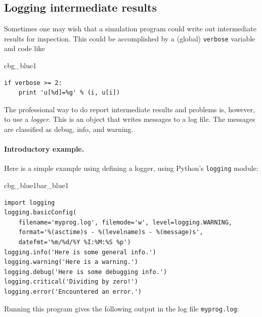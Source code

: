 \documentclass[%
oneside,                 %
final,                   %
10pt]{article}
\newenvironment{_cod_tight}[1]{
   \def\FrameCommand{\colorbox{#1}}
   \FrameRule0.6pt\MakeFramed {\FrameRestore}\vskip3mm}
   {\vskip0mm\endMakeFramed}
\newenvironment{cod}[1]{
\bgroup\rmfamily
\fboxsep=0mm\relax
\begin{_cod_tight}{#1}
\list{}{\parsep=-2mm\parskip=0mm\topsep=0pt\leftmargin=2mm
\rightmargin=2\leftmargin\leftmargin=4pt\relax}
\item\relax}
{\endlist\end{_cod_tight}\egroup}
\newenvironment{_pro_tight}[2]{
   \def\FrameCommand{\color{#2}\vrule width 1mm\normalcolor\colorbox{#1}}
   \FrameRule0.6pt\MakeFramed {\advance\hsize-2mm\FrameRestore}\vskip3mm}
   {\vskip0mm\endMakeFramed}
\newenvironment{pro}[2]{
\bgroup\rmfamily
\fboxsep=0mm\relax
\begin{_pro_tight}{#1}{#2}
\list{}{\parsep=-2mm\parskip=0mm\topsep=0pt\leftmargin=2mm
\rightmargin=2\leftmargin\leftmargin=4pt\relax}
\item\relax}
{\endlist\end{_pro_tight}\egroup}
\begin{document}
\subsection{Logging intermediate results}
\label{softeng1:basic:logging}


Sometimes one may wish that a simulation program could write out
intermediate results for inspection. This could be accomplished by
a (global) \texttt{verbose} variable and code like

\begin{cod}{cbg_blue1}\begin{Verbatim}[numbers=none,fontsize=\fontsize{9pt}{9pt},baselinestretch=0.95,xleftmargin=2mm]
if verbose >= 2:
    print 'u[%d]=%g' % (i, u[i])
\end{Verbatim}
\end{cod}
\noindent
The professional way to do report intermediate results and problems is,
however, to use a \emph{logger}. This is an object that writes messages
to a log file. The messages are classified as debug, info, and warning.

\paragraph{Introductory example.}
Here is a simple example using defining a logger, using Python's \texttt{logging}
module:

\begin{pro}{cbg_blue1}{bar_blue1}\begin{Verbatim}[numbers=none,fontsize=\fontsize{9pt}{9pt},baselinestretch=0.95,xleftmargin=2mm]
import logging
logging.basicConfig(
    filename='myprog.log', filemode='w', level=logging.WARNING,
    format='%(asctime)s - %(levelname)s - %(message)s',
    datefmt='%m/%d/%Y %I:%M:%S %p')
logging.info('Here is some general info.')
logging.warning('Here is a warning.')
logging.debug('Here is some debugging info.')
logging.critical('Dividing by zero!')
logging.error('Encountered an error.')
\end{Verbatim}
\end{pro}
\noindent
Running this program gives the following output in the log file \texttt{myprog.log}:
\end{document}

